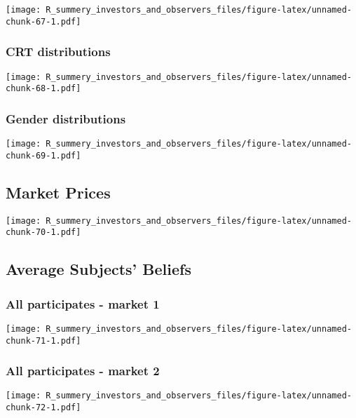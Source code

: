\documentclass[]{article}
\begin{document}
\texttt{[image: R\_summery\_investors\_and\_observers\_files/figure-latex/unnamed-chunk-67-1.pdf]}

\hypertarget{crt-distributions-5}{%
\subsubsection{CRT distributions}\label{crt-distributions-5}}

\texttt{[image: R\_summery\_investors\_and\_observers\_files/figure-latex/unnamed-chunk-68-1.pdf]}

\hypertarget{gender-distributions-5}{%
\subsubsection{Gender distributions}\label{gender-distributions-5}}

\texttt{[image: R\_summery\_investors\_and\_observers\_files/figure-latex/unnamed-chunk-69-1.pdf]}

\hypertarget{market-prices-5}{%
\subsection{Market Prices}\label{market-prices-5}}

\texttt{[image: R\_summery\_investors\_and\_observers\_files/figure-latex/unnamed-chunk-70-1.pdf]}

\hypertarget{average-subjects-beliefs-5}{%
\subsection{Average Subjects'
Beliefs}\label{average-subjects-beliefs-5}}

\hypertarget{all-participates---market-1-5}{%
\subsubsection{All participates - market
1}\label{all-participates---market-1-5}}

\texttt{[image: R\_summery\_investors\_and\_observers\_files/figure-latex/unnamed-chunk-71-1.pdf]}

\hypertarget{all-participates---market-2-5}{%
\subsubsection{All participates - market
2}\label{all-participates---market-2-5}}

\texttt{[image: R\_summery\_investors\_and\_observers\_files/figure-latex/unnamed-chunk-72-1.pdf]}
\end{document}
